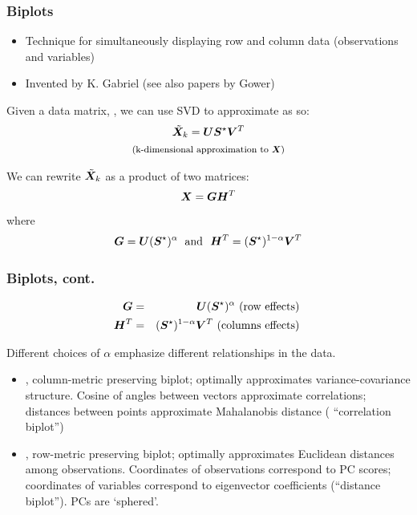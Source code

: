\documentclass{beamer}
\begin{document}
\begin{frame}
  \frametitle{Biplots}

\begin{itemize}
  \item Technique for simultaneously displaying row and column data (observations and variables)
  \item Invented by K. Gabriel (see also papers by Gower)
\end{itemize}

Given a data matrix, , we can use SVD to approximate  as so:
\begin{gather*}
  \tilde{\bm{X}}_k =  \bm{U}\bm{S}^{\star} \bm{V}^T \\
  \text{\footnotesize (k-dimensional approximation to \ensuremath{\bm{X}})}
\end{gather*}


We can rewrite $\tilde{\bm{X}}_k$ as a product of two matrices:
\[
  \bm{X} = \bm{G}\bm{H}^T
\]
where
\[
  \bm{G} = \bm{U}(\bm{S}^{\star})^\alpha\; \text{ and } \ \bm{H}^T = (\bm{S}^{\star})^{1-\alpha}\bm{V}^T
\]
\end{frame}



\begin{frame}
  \frametitle{Biplots, cont.}

\begin{eqnarray*}
\bm{G} &=& \bm{U}(\bm{S}^{\star})^{\alpha} \text{ (row effects) } \\
\bm{H}^T &=& (\bm{S}^{\star})^{1-\alpha} \bm{V}^T \text{ (columns effects) }
\end{eqnarray*}

Different choices of $\alpha$ emphasize different relationships in the data.

\begin{itemize}
\item {}, column-metric preserving biplot; optimally approximates variance-covariance structure. Cosine of angles between vectors approximate correlations; distances between points approximate Mahalanobis distance ( ``correlation biplot'')
\item {}, row-metric preserving biplot; optimally approximates Euclidean distances among observations. Coordinates of observations correspond to PC scores; coordinates of variables correspond to eigenvector coefficients (``distance biplot''). PCs are `sphered'.
\end{itemize}

\end{frame}
\end{document}
